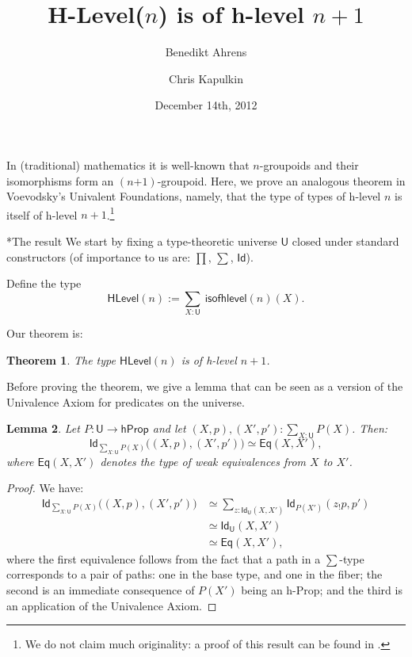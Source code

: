 \documentclass[11pt]{scrartcl}
\makeatletter
\theoremstyle{plain}
\newtheorem{theorem}{Theorem}
\newtheorem{lemma}[theorem]{Lemma}
\theoremstyle{definition}
\newcommand{\Eq}{\mathsf{Eq}}
\newcommand{\HLevel}{\mathsf{HLevel}}
\newcommand{\hProp}{\mathsf{hProp}}
\newcommand{\Id}{\mathsf{Id}}
\newcommand{\isofhlevel}{\mathsf{isofhlevel}}
\newcommand{\U}{\mathsf{U}}
\newcommand{\oftype}{\! : \!}
\renewcommand{\paragraph}{\@startsection{paragraph}{4}{0mm}{-0.5\baselineskip}{-1ex}{\bf}}
\makeatother
\begin{document}
\title{H-Level($n$) is of h-level $n + 1$}

\author{Benedikt Ahrens \and Chris Kapulkin}


\date{December 14th, 2012}
\maketitle

In (traditional) mathematics it is well-known that $n$-groupoids and their isomorphisms form an $(n\mbox{+}1)$-groupoid. Here, we prove an analogous theorem in Voevodsky's Univalent Foundations, namely, that the type of types of h-level $n$ is itself of h-level $n+1$.\footnote{We do not claim much originality: a proof of this result can be found in \cite[Section~8.7]{warren-pelayo:univalent-foundations-paper}.}

\paragraph*{The result} We start by fixing a type-theoretic universe $\U$ closed under standard constructors (of importance to us are: $\prod$, $\sum$, $\Id$).

Define the type
 \[\HLevel(n) := \sum_{X : \U} \ \isofhlevel(n)(X). \]

Our theorem is:

\begin{theorem}\label{main_thm}
 The type $\HLevel(n)$ is of h-level $n+1$.
\end{theorem}

Before proving the theorem, we give a lemma that can be seen as a version of the Univalence Axiom for predicates on the universe.

\begin{lemma}\label{Id_of_Sigma}
 Let $P \colon \U \to \hProp$ and let $(X, p), (X', p') \oftype \sum\limits_{X : \U} P(X)$. Then:
 \[ \Id_{\sum\limits_{X : \U}P(X)} \big( (X, p), (X', p') \big) \simeq \Eq (X, X'),\]
 where $\Eq (X, X')$ denotes the type of weak equivalences from $X$ to $X'$.
\end{lemma}

\begin{proof}
 We have:
 \begin{equation*}\begin{split}
 \Id_{\sum\limits_{X : \U} P(X)} \big( (X, p), (X', p')\big) & \simeq \sum_{z : \Id_{\U} (X, X')} \Id_{P(X')} (z_!p, p') \\
  & \simeq \Id_{\U} (X, X') \\
  & \simeq \Eq (X, X'),
 \end{split}
 \end{equation*}
 where the first equivalence follows from the fact that a path in a $\sum$-type corresponds to a pair of paths: one in the base type, and one in the fiber; the second is an immediate consequence of $P(X')$ being an h-Prop; and the third is an application of the Univalence Axiom.
\end{proof}
\end{document}
